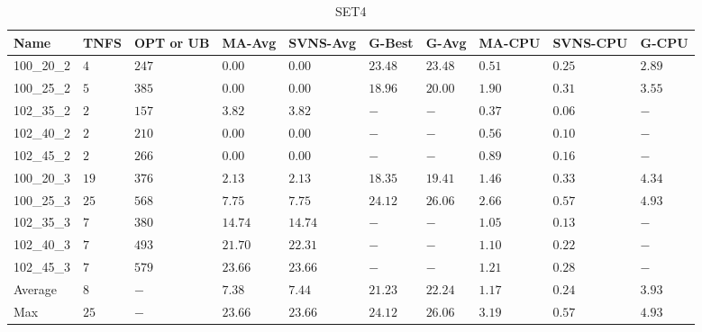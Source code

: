 \begin{center}
\begin{table}[]
\centering
\begin{tabular}{|lll|l|l|ll|lll|}
\hline
Name       & TNFS & OPT or UB & MA-Avg  & SVNS-Avg & G-Best & G-Avg & MA-CPU  & SVNS-CPU & G-CPU \\
\hline
100\_20\_2 & $4 $ & $247$     & $\bm{0.00} $ & $\bm{0.00} $   & $23.48$ & $23.48$ & $0.51$  & $0.25$   & $2.89$ \\
100\_25\_2 & $5 $ & $385$     & $\bm{0.00} $ & $\bm{0.00} $   & $18.96$ & $20.00$ & $1.90$  & $0.31$   & $3.55$ \\
\hline
102\_35\_2 & $2 $ & $157$     & $3.82 $ & $3.82 $   & $-    $ & $-    $ & $0.37$  & $0.06$   & $-   $ \\
102\_40\_2 & $2 $ & $210$     & $\bm{0.00} $ & $\bm{0.00} $   & $-    $ & $-    $ & $0.56$  & $0.10$   & $-   $ \\
102\_45\_2 & $2 $ & $266$     & $\bm{0.00} $ & $\bm{0.00} $   & $-    $ & $-    $ & $0.89$  & $0.16$   & $-   $ \\
\hline
100\_20\_3 & $19$ & $376$     & $2.13 $ & $2.13 $  & $18.35$ & $19.41$ & $1.46$  & $0.33$   & $4.34$ \\
100\_25\_3 & $25$ & $568$     & $7.75 $ & $7.75 $  & $24.12$ & $26.06$ & $2.66$  & $0.57$   & $4.93$ \\
\hline
102\_35\_3 & $7 $ & $380$     & $14.74$ & $14.74$  & $-    $ & $-    $ & $1.05$  & $0.13$   & $-   $ \\
102\_40\_3 & $7 $ & $493$     & $21.70$ & $22.31$  & $-    $ & $-    $ & $1.10$  & $0.22$   & $-   $ \\
102\_45\_3 & $7 $ & $579$     & $23.66$ & $23.66$  & $-    $ & $-    $ & $1.21$  & $0.28$   & $-   $ \\
\hline
Average    & $8 $ & $-  $     & $7.38$  & $7.44$   & $21.23$ & $22.24$ & $1.17$  & $0.24$   & $3.93$ \\
Max        & $25$ & $-  $     & $23.66$ & $23.66$  & $24.12$ & $26.06$ & $3.19$  & $0.57$   & $4.93$ \\
\hline
\end{tabular}
\caption{SET4}
\label{set4}
\end{table}
\end{center}
